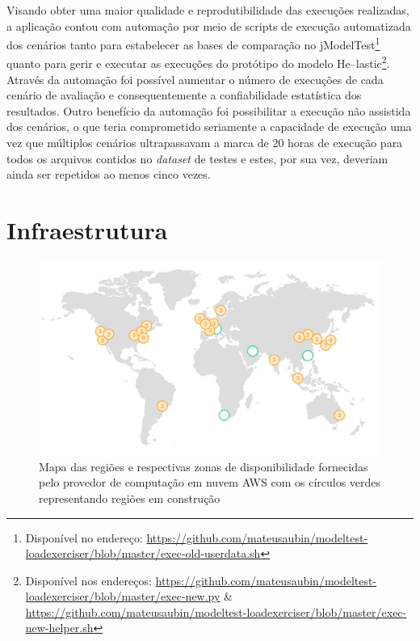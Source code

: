 \documentclass[english,brazilian]{UNISINOSmonografia} %
\newcommand\defaultFigureWidth{0.9}
\begin{document}
Visando obter uma maior qualidade e reprodutibilidade das execuções realizadas, a aplicação contou com automação por meio de scripts de execução automatizada dos cenários tanto para estabelecer as bases de comparação no jModelTest\footnote{Disponível no endereço: \url{https://github.com/mateusaubin/modeltest-loadexerciser/blob/master/exec-old-userdata.sh}} quanto para gerir e executar as execuções do protótipo do modelo \textsf{He}--lastic\footnote{
	Disponível nos endereços: \url{https://github.com/mateusaubin/modeltest-loadexerciser/blob/master/exec-new.py}
	\&
	\url{https://github.com/mateusaubin/modeltest-loadexerciser/blob/master/exec-new-helper.sh}
}. 
Através da automação foi possível aumentar o número de execuções de cada cenário de avaliação e consequentemente a confiabilidade estatística dos resultados.
Outro benefício da automação foi possibilitar a execução não assistida dos cenários, o que teria comprometido seriamente a capacidade de execução uma vez que múltiplos cenários ultrapassavam a marca de 20 horas de execução para todos os arquivos contidos no \textit{dataset} de testes e estes, por sua vez, deveriam ainda ser repetidos ao menos cinco vezes.



\section{Infraestrutura}


\begin{figure}[tb]
	\centering%
	\begin{minipage}{\defaultFigureWidth\textwidth}
		\caption{Mapa das regiões e respectivas zonas de disponibilidade fornecidas pelo provedor de computação em nuvem AWS com os círculos verdes representando regiões em construção}
		\label{fig:metodologia-infra-awsregions}
		\includegraphics[width=\textwidth]{aws-regions}
	\end{minipage}
\end{figure}
\end{document}
